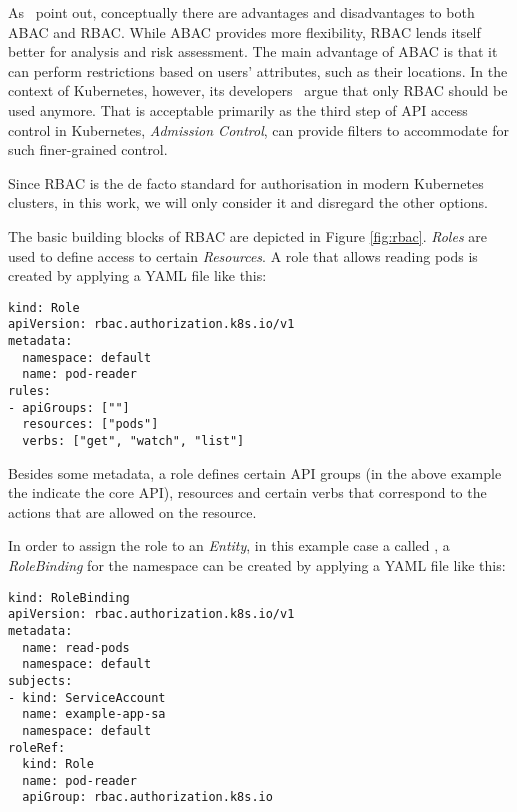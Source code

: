 As~\textcite{ABACvsRBAC} point out, conceptually there are advantages and disadvantages to both ABAC and RBAC. While ABAC provides more flexibility, RBAC lends itself better for analysis and risk assessment. The main advantage of ABAC is that it can perform restrictions based on users' attributes, such as their locations. In the context of Kubernetes, however, its developers~\textcite{ABACvsRBACk8s} argue that only RBAC should be used anymore. That is acceptable primarily as the third step of API access control in Kubernetes, \textit{Admission Control}, can provide filters to accommodate for such finer-grained control.

Since RBAC is the de facto standard for authorisation in modern Kubernetes clusters, in this work, we will only consider it and disregard the other options.


The basic building blocks of RBAC are depicted in Figure \ref{fig:rbac}. \textit{Roles} are used to define access to certain \textit{Resources}. A role that allows reading pods is created by applying a YAML file like this: 

\begin{lstlisting}[frame=single]
kind: Role
apiVersion: rbac.authorization.k8s.io/v1
metadata:
  namespace: default
  name: pod-reader
rules:
- apiGroups: [""]
  resources: ["pods"]
  verbs: ["get", "watch", "list"]
\end{lstlisting}

Besides some metadata, a role defines certain API groups (in the above example the  indicate the core API), resources and certain verbs that correspond to the actions that are allowed on the resource. 

In order to assign the role to an \textit{Entity}, in this example case a  called , a \textit{RoleBinding} for the namespace  can be created by applying a YAML file like this:

\begin{lstlisting}[frame=single]
kind: RoleBinding
apiVersion: rbac.authorization.k8s.io/v1
metadata:
  name: read-pods
  namespace: default
subjects:
- kind: ServiceAccount
  name: example-app-sa 
  namespace: default
roleRef:
  kind: Role
  name: pod-reader
  apiGroup: rbac.authorization.k8s.io
\end{lstlisting}

